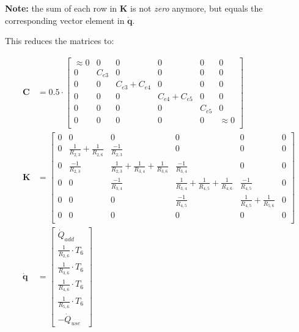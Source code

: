 \textbf{Note:} the sum of each row in $\mathbf{K}$ is not \emph{zero} anymore, but equals the corresponding vector element in $\mathbf{\dot{q}}$.

This reduces the matrices to:

\begin{equation}
	\begin{aligned}
		\mathbf{C} & =
		0.5 \cdot 
		\begin{bmatrix}
			\approx 0 & 0 & 0 & 0 & 0 & 0 \\
			0 & C_{e3} & 0 & 0 & 0 & 0 \\
			0 & 0 & C_{e3} + C_{e4} & 0 & 0 & 0 \\
			0 & 0 & 0 & C_{e4} + C_{e5} & 0 & 0 \\
			0 & 0 & 0 & 0 & C_{e5} & 0 \\
			0 & 0 & 0 & 0 & 0 & \approx 0 \\
		\end{bmatrix} \\
        \mathbf{K} & =
			\begin{bmatrix}
				0 & 0 & 0 & 0 & 0 & 0 \\
				0 & \frac{1}{R_{2,3}} + \frac{1}{R_{2,6}} & \frac{-1}{R_{2,3}} & 0 & 0 & 0 \\
				0 & \frac{-1}{R_{2,3}} & \frac{1}{R_{2,3}} + \frac{1}{R_{3,4}} + \frac{1}{R_{3,6}} & \frac{-1}{R_{3,4}} & 0 & 0 \\
				0 & 0 & \frac{-1}{R_{3,4}} & \frac{1}{R_{3,4}} +  \frac{1}{R_{4,5}} + \frac{1}{R_{4,6}} & \frac{-1}{R_{4,5}} & 0\\
				0 & 0 & 0 & \frac{-1}{R_{4,5}} & \frac{1}{R_{4,5}} + \frac{1}{R_{5,6}} & 0 \\
				0 & 0 & 0 & 0 & 0 & 0\\
		\end{bmatrix} \\
        \mathbf{\dot{q}} & =
	        \begin{bmatrix}
		        \dot{Q}_{add} \\
		        \frac{1}{R_{2,6}} \cdot T_6 \\
		        \frac{1}{R_{3,6}} \cdot T_6 \\
		        \frac{1}{R_{4,6}} \cdot T_6 \\
		        \frac{1}{R_{5,6}} \cdot T_6 \\
		        -\dot{Q}_{use}
	        \end{bmatrix}
	\end{aligned}
\end{equation}

